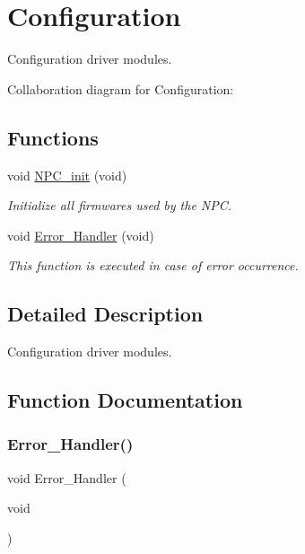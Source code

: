 \hypertarget{group___configuration}{}\section{Configuration}
\label{group___configuration}


Configuration driver modules.  


Collaboration diagram for Configuration\+:
\subsection*{Functions}
\begin{DoxyCompactItemize}
\item 
void \hyperlink{group___configuration_gabe73c51b6f7ce590321d186bef079fe4}{N\+P\+C\+\_\+init} (void)
\begin{DoxyCompactList}\small\item\em Initialize all firmwares used by the N\+PC. \end{DoxyCompactList}\item 
void \hyperlink{group___configuration_ga1730ffe1e560465665eb47d9264826f9}{Error\+\_\+\+Handler} (void)
\begin{DoxyCompactList}\small\item\em This function is executed in case of error occurrence. \end{DoxyCompactList}\end{DoxyCompactItemize}


\subsection{Detailed Description}
Configuration driver modules. 



\subsection{Function Documentation}
\mbox{\label{group___configuration_ga1730ffe1e560465665eb47d9264826f9}} 
\subsubsection{\texorpdfstring{Error\+\_\+\+Handler()}{Error\_Handler()}}
{\footnotesize\ttfamily void Error\+\_\+\+Handler (\begin{DoxyParamCaption}\item[{void}]{ }\end{DoxyParamCaption})}



